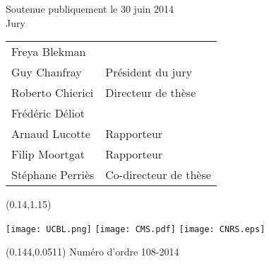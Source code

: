 \begin{titlepage}
\vspace{1em}

\begin{center} \small
Soutenue publiquement le 30 juin 2014 \\
Jury \\
\begin{tabular}{L{5cm}l}
Freya Blekman & \\
Guy Chanfray & Président du jury \\
Roberto Chierici & Directeur de thèse \\
Frédéric Déliot & \\
Arnaud Lucotte & Rapporteur \\
Filip Moortgat & Rapporteur \\
Stéphane Perriès & Co-directeur de thèse
\end{tabular}

\end{center}

\vfill

\begin{textblock}{1}(0.14,1.15)
\begin{center}
\texttt{[image: UCBL.png]} \hspace{1cm}  \hspace{1cm} \texttt{[image: CMS.pdf]} \hspace{1cm} \texttt{[image: CNRS.eps]}
\end{center}
\end{textblock}

\begin{textblock}{1}(0.144,0.0511)
Numéro d'ordre 108-2014
\end{textblock}

\end{titlepage}